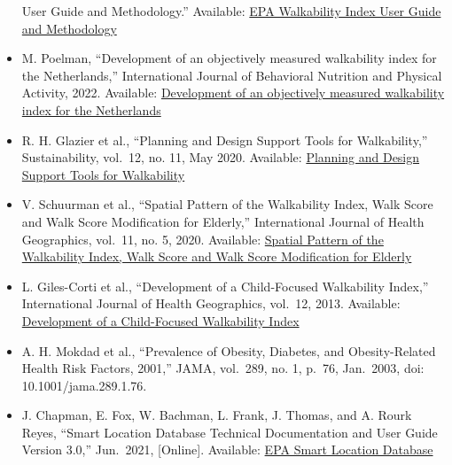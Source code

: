 \documentclass[
]{article}
\begin{document}
\begin{itemize}
  User Guide and Methodology.'' Available:
  \href{https://www.epa.gov/smartgrowth/national-walkability-index-user-guide-and-methodology}{EPA
  Walkability Index User Guide and Methodology}
\item
  M. Poelman, ``Development of an objectively measured walkability index
  for the Netherlands,'' International Journal of Behavioral Nutrition
  and Physical Activity, 2022. Available:
  \href{https://ijbnpa.biomedcentral.com/articles/10.1186/s12966-022-01270-8}{Development
  of an objectively measured walkability index for the Netherlands}
\item
  R. H. Glazier et al., ``Planning and Design Support Tools for
  Walkability,'' Sustainability, vol.~12, no. 11, May 2020. Available:
  \href{https://www.mdpi.com/2071-1050/12/11/4405}{Planning and Design
  Support Tools for Walkability}
\item
  V. Schuurman et al., ``Spatial Pattern of the Walkability Index, Walk
  Score and Walk Score Modification for Elderly,'' International Journal
  of Health Geographics, vol.~11, no. 5, 2020. Available:
  \href{https://www.mdpi.com/2220-9964/11/5/279}{Spatial Pattern of the
  Walkability Index, Walk Score and Walk Score Modification for Elderly}
\item
  L. Giles-Corti et al., ``Development of a Child-Focused Walkability
  Index,'' International Journal of Health Geographics, vol.~12, 2013.
  Available:
  \href{https://ij-healthgeographics.biomedcentral.com/articles/10.1186/1476-072X-12-61}{Development
  of a Child-Focused Walkability Index}
\item
  A. H. Mokdad et al., ``Prevalence of Obesity, Diabetes, and
  Obesity-Related Health Risk Factors, 2001,'' JAMA, vol.~289, no. 1,
  p.~76, Jan.~2003, doi: 10.1001/jama.289.1.76.
\item
  J. Chapman, E. Fox, W. Bachman, L. Frank, J. Thomas, and A. Rourk
  Reyes, ``Smart Location Database Technical Documentation and User
  Guide Version 3.0,'' Jun.~2021, {[}Online{]}. Available:
  \href{https://www.epa.gov/system/files/documents/2023-10/epa_sld_3.0_technicaldocumentationuserguide_may2021_0.pdf}{EPA
  Smart Location Database}
\end{itemize}
\end{document}
